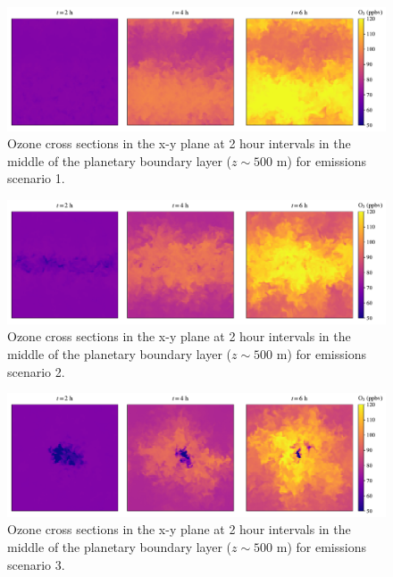 \begin{figure}[!t]
    \centering
    \includegraphics[width=.9\textwidth]{figures/chapter4/o3-crosssec-fx1fy0-z25.pdf}
    \caption{Ozone cross sections in the x-y plane at 2 hour intervals in the middle of the planetary boundary layer ($z\sim500$ \si{m}) for emissions scenario 1.}
    \label{fig:o3-crosssec-s1}
\end{figure}

\begin{figure}[!t]
    \centering
    \includegraphics[width=.9\textwidth]{figures/chapter4/o3-crosssec-road-10x-z25.pdf}
    \caption{Ozone cross sections in the x-y plane at 2 hour intervals in the middle of the planetary boundary layer ($z\sim500$ \si{m}) for emissions scenario 2.}
    \label{fig:o3-crosssec-s2}
\end{figure}

  \begin{figure}[!t]
    \centering
    \includegraphics[width=.9\textwidth]{figures/chapter4/o3-crosssec-point-source-1x1-z25.pdf}
    \caption{Ozone cross sections in the x-y plane at 2 hour intervals in the middle of the planetary boundary layer ($z\sim500$ \si{m}) for emissions scenario 3.}
    \label{fig:o3-crosssec-s3}
\end{figure}

